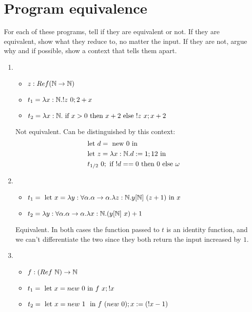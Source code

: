 \documentclass{article}
\begin{document}
\section{Program equivalence}
For each of these programs, tell if they are equivalent or not. If they are equivalent, show what they reduce to, no matter the input. If they are not, argue why and if possible, show a context that tells them apart.
\begin{enumerate}
    \item
        \begin{itemize}
            \item $z:Ref(\mathbb N\to\mathbb N)$
            \item $t_1=\lam{x:\N}{!z\ 0;2+x}$
            \item $t_2=\lam{x:\N}{\IF x>0 \THEN x+2 \ELSE !z\ x;x+2}$
        \end{itemize}
        Not equivalent. Can be distinguished by this context:
        \begin{align*}
            & \LET d = \NEW 0 \TIN\\
            & \LET z = \lam{x:\N}{d:=1;12} \TIN\\
            &\ t_{1/2}\ 0; \IF !d == 0 \THEN 0 \ELSE \omega
        \end{align*}
    \item 
        \begin{itemize}
            \item $t_1= \LET x=\lam{y:\forall\alpha.\alpha\to\alpha}\lam{z:\N}{y[\N]\ (z+1)} \TIN x$
            \item $t_2= \lam{y:\forall\alpha.\alpha\to\alpha}\lam{x:\N}{(y[\N]\ x)+1}$
        \end{itemize}
        Equivalent. In both cases the function passed to $t$ is an identity function, and we can't differentiate the two since they both return the input increased by $1$.

    \item 
        \begin{itemize}
            \item $f:(Ref\ \mathbb N)\to\mathbb N$
            \item $t_1=\text{ let } x= new\ 0 \text{ in } f\ x; !x$
            \item $t_2=\text{ let } x= new\ 1\ \text{ in } f\ (new\ 0); x:=(!x-1)$
        \end{itemize}


\end{enumerate}
\end{document}
